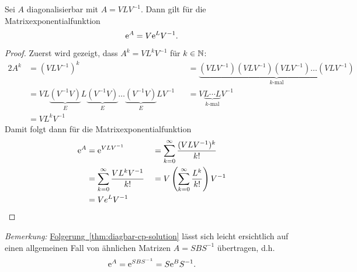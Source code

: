 \begin{corollary}
    Sei $A$ diagonalisierbar mit $A = V L V^{-1}$.
    Dann gilt für die Matrixexponentialfunktion
    \begin{equation*}
        \mathrm{e}^{A} = V \mathrm{e}^{L} V^{-1}.
    \end{equation*}
\end{corollary}

\begin{proof}
    Zuerst wird gezeigt, dass $A^k = V L^k V^{-1}$ für $k \in \mathbb{N}$:
    \begin{alignat*}{2}
        A^k &= (V L V^{-1})^k &&= \underbrace{(V L V^{-1}) (V L V^{-1}) (V L V^{-1}) \dots (V L V^{-1})}_{k \text{-mal}}\\
            &= V L \underbrace{(V^{-1} V)}_{E} L \underbrace{(V^{-1} V)}_{E} \dots \underbrace{(V^{-1} V)}_{E} L V^{-1} &&= V \underbrace{L \cdots L}_{k \text{-mal}} V^{-1}\\
            &= V L^k V^{-1}
    \end{alignat*}
    Damit folgt dann für die Matrixexponentialfunktion
    \begin{alignat*}{2}
        \mathrm{e}^{A} &= \mathrm{e}^{V L V^{-1}} &&= \sum^\infty_{k=0} \frac{(V L V^{-1})^k}{k!}\\
               &= \sum^\infty_{k=0} \frac{V L^k V^{-1}}{k!} &&= V \left( \sum^\infty_{k=0} \frac{L^k}{k!} \right) V^{-1}\\
               &= V e^L V^{-1}
    \end{alignat*}
\end{proof}

\emph{Bemerkung:} \hyperref[thm:diagbar-cp-solution]{Folgerung~\ref*{thm:diagbar-cp-solution}} lässt sich leicht ersichtlich auf einen allgemeinen Fall von ähnlichen Matrizen $A = S B S^{-1}$ übertragen, d.h.
\begin{equation*}
    \mathrm{e}^A = \mathrm{e}^{S B S^{-1}} = S \mathrm{e}^B S^{-1}.
\end{equation*}

